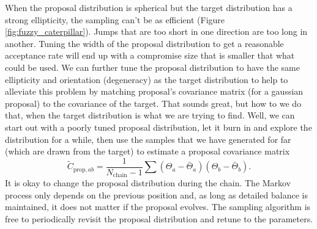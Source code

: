 When the proposal distribution is spherical but the target distribution has a strong ellipticity, the sampling can't be as efficient (Figure \ref{fig:fuzzy_caterpillar}).  Jumps that are too short in one direction are too long in another.  Tuning the width of the proposal distribution to get a reasonable acceptance rate will end up with a compromise size that is smaller that what could be used.  We can further tune the proposal distribution to have the same ellipticity and orientation (degeneracy) as the target distribution to help to alleviate this problem by matching proposal's covariance matrix (for a gaussian proposal) to the covariance of the target.  That sounds great, but how to we do that, when the target distribution is what we are trying to find.  Well, we can start out with a poorly tuned proposal distribution, let it burn in and explore the distribution for a while, then use the samples that we have generated for far (which are drawn from the target) to estimate a proposal covariance matrix
\begin{equation}
  \tilde C_{\textrm{prop},ab} = \frac{1}{N_\textrm{chain} - 1} \sum ( \Theta_a - \bar \Theta_a)  ( \Theta_b - \bar \Theta_b).
\end{equation}
It is okay to change the proposal distribution during the chain.  The Markov process only depends on the previous position and, as long as detailed balance is maintained, it does not matter if the proposal evolves.  The sampling algorithm is free to periodically revisit the proposal distribution and retune to the parameters.


